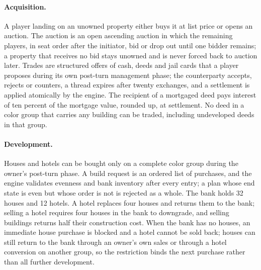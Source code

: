 \paragraph{Acquisition.} A player landing on an unowned property either buys it at list price or opens an auction. The auction is an open ascending auction in which the remaining players, in seat order after the initiator, bid or drop out until one bidder remains; a property that receives no bid stays unowned and is never forced back to auction later. Trades are structured offers of cash, deeds and jail cards that a player proposes during its own post-turn management phase; the counterparty accepts, rejects or counters, a thread expires after twenty exchanges, and a settlement is applied atomically by the engine. The recipient of a mortgaged deed pays interest of ten percent of the mortgage value, rounded up, at settlement. No deed in a color group that carries any building can be traded, including undeveloped deeds in that group.

\paragraph{Development.} Houses and hotels can be bought only on a complete color group during the owner's post-turn phase. A build request is an ordered list of purchases, and the engine validates evenness and bank inventory after every entry; a plan whose end state is even but whose order is not is rejected as a whole. The bank holds 32 houses and 12 hotels. A hotel replaces four houses and returns them to the bank; selling a hotel requires four houses in the bank to downgrade, and selling buildings returns half their construction cost. When the bank has no houses, an immediate house purchase is blocked and a hotel cannot be sold back; houses can still return to the bank through an owner's own sales or through a hotel conversion on another group, so the restriction binds the next purchase rather than all further development.

